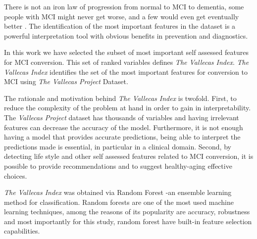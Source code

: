 \documentclass[preprint,12pt]{elsarticle}
\begin{document}
There is not an iron law of progression from normal to MCI to dementia, some people with MCI might never get worse, and a few would even get eventually better \cite{avila2017subjective}. The identification of the most important features in the dataset is a powerful interpretation tool with obvious benefits in prevention and diagnostics. 

In this work we have selected the subset of most important self assessed features for MCI conversion. This set of ranked variables defines \emph{The Vallecas Index}. 
\emph{The Vallecas Index} identifies the set of the most important features for conversion to MCI using \emph{The Vallecas Project} Dataset. 

The rationale and motivation behind \emph{The Vallecas Index} is twofold. First, to reduce the complexity of the problem at hand in order to gain in interpretability. The \emph{Vallecas Project} dataset has thousands of variables and having irrelevant features can decrease the accuracy of the model. Furthermore, it is not enough having a model that provides accurate predictions, being able to interpret the predictions made is essential, in particular in a clinical domain.
Second, by detecting life style and other self assessed features related to MCI conversion, it is possible to provide recommendations and to suggest healthy-aging effective choices.


\emph{The Vallecas Index} was obtained via Random Forest -an ensemble learning method for classification. Random forests are one of the most used machine learning techniques, among the reasons of its popularity are accuracy, robustness and most importantly for this study, random forest have built-in feature selection capabilities. 
\end{document}
